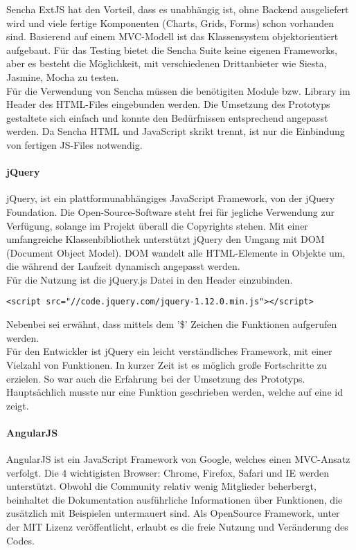 Sencha ExtJS hat den Vorteil, dass es unabhängig ist, ohne Backend ausgeliefert wird und viele fertige Komponenten (Charts, Grids, Forms) schon vorhanden sind. Basierend auf einem MVC-Modell ist das Klassensystem objektorientiert aufgebaut. Für das Testing bietet die Sencha Suite keine eigenen Frameworks, aber es besteht die Möglichkeit, mit verschiedenen Drittanbieter wie \grqq{}Siesta, Jasmine, Mocha\grqq{} zu testen.\cite{SENCHAFEATURES}\cite{SENCHALICENSE}\\

Für die Verwendung von Sencha müssen die benötigiten Module bzw. Library im Header des HTML-Files eingebunden werden. Die Umsetzung des Prototyps gestaltete sich einfach und konnte den Bedürfnissen entsprechend angepasst werden. Da Sencha HTML und JavaScript skrikt trennt, ist nur die Einbindung von fertigen JS-Files notwendig.

\paragraph{jQuery}
jQuery, ist ein plattformunabhängiges JavaScript Framework, von der jQuery Foundation. Die Open-Source-Software steht frei für jegliche Verwendung zur Verfügung, solange im Projekt überall die Copyrights stehen. Mit einer umfangreiche Klassenbibliothek unterstützt jQuery den Umgang mit DOM (Document Object Model). DOM wandelt alle HTML-Elemente in Objekte um, die während der Laufzeit dynamisch angepasst werden.\cite{JQUERY} \\

Für die Nutzung ist die jQuery.js Datei in den Header einzubinden.
\begin{lstlisting}[caption={jQuery einbinden\cite{JQUERYDOWN}}]
<script src="//code.jquery.com/jquery-1.12.0.min.js"></script>
\end{lstlisting}
Nebenbei sei erwähnt, dass mittels dem '\$' Zeichen die Funktionen aufgerufen werden.\\

Für den Entwickler ist jQuery ein leicht verständliches Framework, mit einer Vielzahl von Funktionen. In kurzer Zeit ist es möglich große Fortschritte zu erzielen. So war auch die Erfahrung bei der Umsetzung des Prototyps. Hauptsächlich musste nur eine Funktion geschrieben werden, welche auf eine id zeigt. \cite{JQUERYTOOL}

\paragraph{AngularJS}
AngularJS ist ein JavaScript Framework von Google, welches einen MVC-Ansatz verfolgt. Die 4 wichtigisten Browser: Chrome, Firefox, Safari und IE werden unterstützt. Obwohl die Community relativ wenig Mitglieder beherbergt, beinhaltet die Dokumentation ausführliche Informationen über Funktionen, die zusätzlich mit Beispielen untermauert sind. Als OpenSource Framework, unter der MIT Lizenz veröffentlicht, erlaubt es die freie Nutzung und Veränderung des Codes.\\

